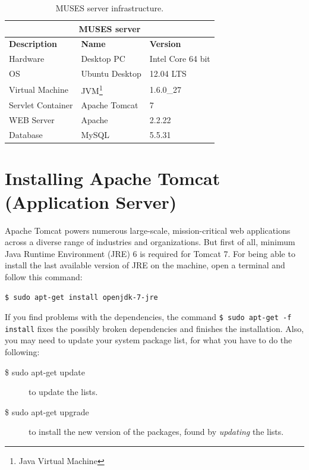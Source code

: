 \documentclass[a4paper,11pt]{book}
\begin{document}
\begin{table}
  \caption{MUSES server infrastructure.}
  \label{tab:server_infrastructure}

  \begin{center}
    \begin{tabular}{ |l|l|l| }
    \hline
    \multicolumn{3}{|c|}{\textbf{MUSES server}} \\
    \hline
    \textbf{Description} & \textbf{Name} & \textbf{Version} \\
    \hline
    Hardware & Desktop PC & Intel Core 64 bit \\
    OS & Ubuntu Desktop & 12.04 LTS \\
    Virtual Machine & JVM\footnote{Java Virtual Machine} & 1.6.0\_27 \\
    Servlet Container & Apache Tomcat & 7 \\
    WEB Server & Apache & 2.2.22 \\
    Database & MySQL & 5.5.31 \\
    \hline
    \end{tabular}
  \end{center}
\end{table}

\section{Installing Apache Tomcat (Application Server)}
\label{sec:tomcat}

Apache Tomcat powers numerous large-scale, mission-critical web applications across a diverse range of industries and organizations. But first of all, minimum Java Runtime Environment (JRE) 6 is required for Tomcat 7. For being able to install the last available version of JRE on the machine, open a terminal and follow this command:

\begin{verbatim}
$ sudo apt-get install openjdk-7-jre
\end{verbatim}

If you find problems with the dependencies, the command \texttt{\$ sudo apt-get -f install} fixes the possibly broken dependencies and finishes the installation. Also, you may need to update your system package list, for what you have to do the following:

\begin{description}
  \item[\$ sudo apt-get update] to update the lists.
  \item[\$ sudo apt-get upgrade] to install the new version of the packages, found by \textit{updating} the lists.
\end{description}
\end{document}
